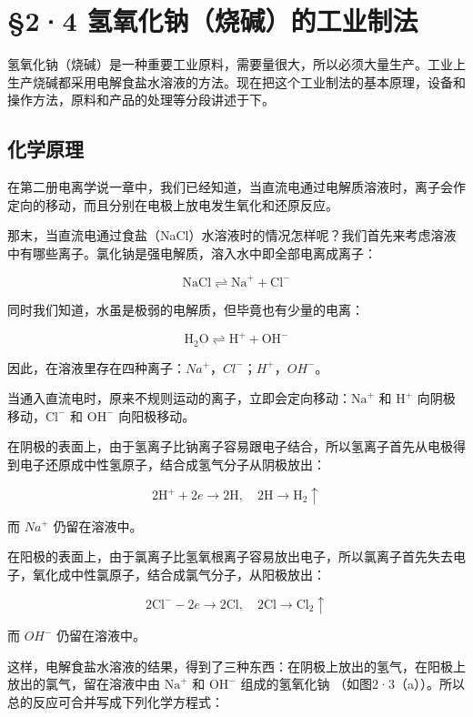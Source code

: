 \section{§2·4 氢氧化钠（烧碱）的工业制法}

氢氧化钠（烧碱）是一种重要工业原料，需要量很大，所以必须大量生产。工业上生产烧碱都采用电解食盐水溶液的方法。现在把这个工业制法的基本原理，设备和操作方法，原料和产品的处理等分段讲述于下。

\subsection{化学原理}

在第二册电离学说一章中，我们已经知道，当直流电通过电解质溶液时，离子会作定向的移动，而且分别在电极上放电发生氧化和还原反应。

那末，当直流电通过食盐（NaCl）水溶液时的情况怎样呢？我们首先来考虑溶液中有哪些离子。氯化钠是强电解质，溶入水中即全部电离成离子：

\[
\mathrm{NaCl} \rightleftharpoons \mathrm{Na} ^ {+} + \mathrm{Cl} ^ {-}
\]

同时我们知道，水虽是极弱的电解质，但毕竟也有少量的电离：

\[
\mathrm{H} _ {2} \mathrm{O} \rightleftharpoons \mathrm{H} ^ {+} + \mathrm{OH} ^ {-}
\]

因此，在溶液里存在四种离子：\(Na^{+}\)，\(Cl^{-}\)；\(H^{+}\)，\(OH^{-}\)。

当通入直流电时，原来不规则运动的离子，立即会定向移动：\(\mathrm{Na}^{+}\)
和 \(\mathrm{H}^{+}\) 向阴极移动，\(\mathrm{Cl}^{-}\) 和
\(\mathrm{OH}^{-}\) 向阳极移动。

在阴极的表面上，由于氢离子比钠离子容易跟电子结合，所以氢离子首先从电极得到电子还原成中性氢原子，结合成氢气分子从阴极放出：

\[
2 \mathrm{H} ^ {+} + 2 e \longrightarrow 2 \mathrm{H}, \quad 2 \mathrm{H} \longrightarrow \mathrm{H} _ {2} \uparrow
\]

而 \(Na^{+}\) 仍留在溶液中。

在阳极的表面上，由于氯离子比氢氧根离子容易放出电子，所以氯离子首先失去电子，氧化成中性氯原子，结合成氯气分子，从阳极放出：

\[
2 \mathrm{Cl} ^ {-} - 2 e \longrightarrow 2 \mathrm{Cl}, \quad 2 \mathrm{Cl} \longrightarrow \mathrm{Cl} _ {2} \uparrow
\]

而 \(OH^{-}\) 仍留在溶液中。

这样，电解食盐水溶液的结果，得到了三种东西：在阴极上放出的氢气，在阳极上放出的氯气，留在溶液中由
\(\mathrm{Na}^{+}\) 和 \(\mathrm{OH}^{-}\) 组成的氢氧化钠 （如图2·3（a））。所以总的反应可合并写成下列化学方程式：

